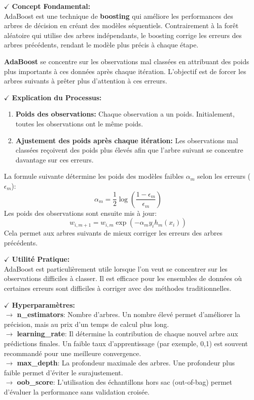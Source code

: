 \textbf{\(\checkmark\)} \textbf{Concept Fondamental:}\\
AdaBoost est une technique de \textbf{boosting} qui améliore les performances des arbres de décision en créant des modèles séquentiels. Contrairement à la forêt aléatoire qui utilise des arbres indépendants, le boosting corrige les erreurs des arbres précédents, rendant le modèle plus précis à chaque étape.

\textbf{AdaBoost} se concentre sur les observations mal classées en attribuant des poids plus importants à ces données après chaque itération. L’objectif est de forcer les arbres suivants à prêter plus d’attention à ces erreurs.

\textbf{\(\checkmark\)} \textbf{Explication du Processus:}
\begin{enumerate}
    \item \textbf{Poids des observations:} Chaque observation a un poids. Initialement, toutes les observations ont le même poids.
    \item \textbf{Ajustement des poids après chaque itération:} Les observations mal classées reçoivent des poids plus élevés afin que l’arbre suivant se concentre davantage sur ces erreurs.
\end{enumerate}

La formule suivante détermine les poids des modèles faibles \( \alpha_m \) selon les erreurs (\( \epsilon_m \)):
\[
\alpha_m = \frac{1}{2} \log\left(\frac{1 - \epsilon_m}{\epsilon_m}\right)
\]
Les poids des observations sont ensuite mis à jour:
\[
w_{i,m+1} = w_{i,m} \exp(-\alpha_m y_i h_m(x_i))
\]
Cela permet aux arbres suivants de mieux corriger les erreurs des arbres précédents.

\textbf{\(\checkmark\)} \textbf{Utilité Pratique:}\\
AdaBoost est particulièrement utile lorsque l’on veut se concentrer sur les observations difficiles à classer. Il est efficace pour les ensembles de données où certaines erreurs sont difficiles à corriger avec des méthodes traditionnelles.

\textbf{\(\checkmark\)} \textbf{Hyperparamètres:}\\
\noindent \textbf{\(\rightarrow\)} \textbf{n\_estimators}: Nombre d’arbres. Un nombre élevé permet d’améliorer la précision, mais au prix d’un temps de calcul plus long.\\
\noindent \textbf{\(\rightarrow\)} \textbf{learning\_rate}: Il détermine la contribution de chaque nouvel arbre aux prédictions finales. Un faible taux d’apprentissage (par exemple, 0,1) est souvent recommandé pour une meilleure convergence.\\
\noindent \textbf{\(\rightarrow\)} \textbf{max\_depth}: La profondeur maximale des arbres. Une profondeur plus faible permet d’éviter le surajustement.\\
\noindent \textbf{\(\rightarrow\)} \textbf{oob\_score}: L’utilisation des échantillons hors sac (out-of-bag) permet d’évaluer la performance sans validation croisée.

